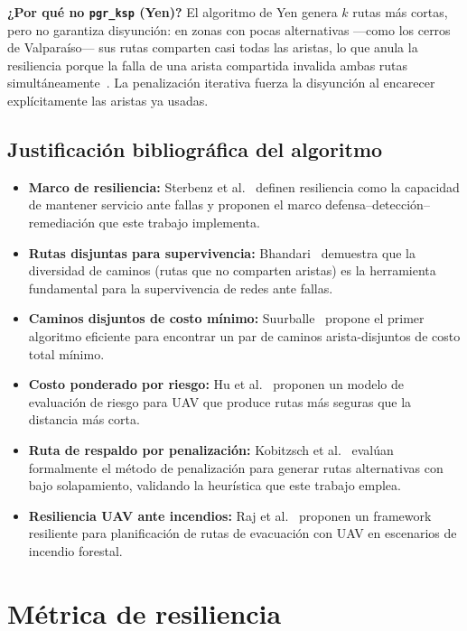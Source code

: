 \documentclass[conference]{IEEEtran}
\begin{document}
\textbf{¿Por qué no \texttt{pgr\_ksp} (Yen)?} El algoritmo de Yen genera $k$ rutas más cortas, pero no garantiza disyunción: en zonas con pocas alternativas ---como los cerros de Valparaíso--- sus rutas comparten casi todas las aristas, lo que anula la resiliencia porque la falla de una arista compartida invalida ambas rutas simultáneamente~\cite{bhandari1999}. La penalización iterativa fuerza la disyunción al encarecer explícitamente las aristas ya usadas.

\subsection{Justificación bibliográfica del algoritmo}

\begin{itemize}[itemsep=2pt]
\item \textbf{Marco de resiliencia:} Sterbenz et al.~\cite{sterbenz2010} definen resiliencia como la capacidad de mantener servicio ante fallas y proponen el marco defensa--detección--remediación que este trabajo implementa.
\item \textbf{Rutas disjuntas para supervivencia:} Bhandari~\cite{bhandari1999} demuestra que la diversidad de caminos (rutas que no comparten aristas) es la herramienta fundamental para la supervivencia de redes ante fallas.
\item \textbf{Caminos disjuntos de costo mínimo:} Suurballe~\cite{suurballe1974} propone el primer algoritmo eficiente para encontrar un par de caminos arista-disjuntos de costo total mínimo.
\item \textbf{Costo ponderado por riesgo:} Hu et al.~\cite{hu2020} proponen un modelo de evaluación de riesgo para UAV que produce rutas más seguras que la distancia más corta.
\item \textbf{Ruta de respaldo por penalización:} Kobitzsch et al.~\cite{kobitzsch2013} evalúan formalmente el método de penalización para generar rutas alternativas con bajo solapamiento, validando la heurística que este trabajo emplea.
\item \textbf{Resiliencia UAV ante incendios:} Raj et al.~\cite{raj2025} proponen un framework resiliente para planificación de rutas de evacuación con UAV en escenarios de incendio forestal.
\end{itemize}


\section{Métrica de resiliencia}
\label{sec:metrica}
\end{document}
